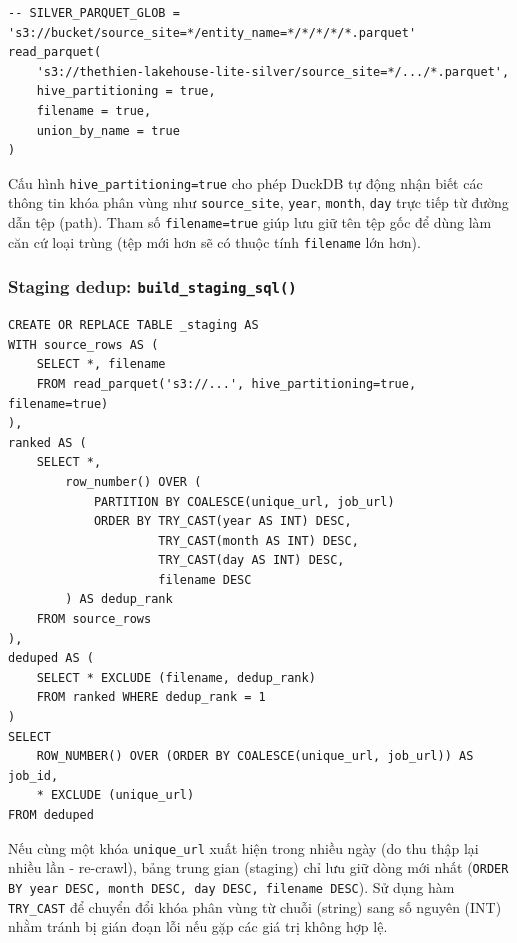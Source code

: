 \begin{lstlisting}[style=sqlstyle, caption={DuckDB read\_parquet với hive partitioning}, label={lst:read-parquet-sql}]
-- SILVER_PARQUET_GLOB = 's3://bucket/source_site=*/entity_name=*/*/*/*/*.parquet'
read_parquet(
    's3://thethien-lakehouse-lite-silver/source_site=*/.../*.parquet',
    hive_partitioning = true,
    filename = true,
    union_by_name = true
)
\end{lstlisting}

Cấu hình \texttt{hive\_partitioning=true} cho phép DuckDB tự động nhận biết các thông tin khóa phân vùng như
\texttt{source\_site}, \texttt{year}, \texttt{month}, \texttt{day}
trực tiếp từ đường dẫn tệp (path). Tham số \texttt{filename=true} giúp lưu giữ tên tệp gốc để dùng làm căn cứ loại trùng
(tệp mới hơn sẽ có thuộc tính \texttt{filename} lớn hơn).

\subsubsection{Staging dedup: \texttt{build\_staging\_sql()}}

\begin{lstlisting}[style=sqlstyle, caption={Staging: dedup theo unique\_url + gán job\_id}, label={lst:staging-sql}]
CREATE OR REPLACE TABLE _staging AS
WITH source_rows AS (
    SELECT *, filename
    FROM read_parquet('s3://...', hive_partitioning=true, filename=true)
),
ranked AS (
    SELECT *,
        row_number() OVER (
            PARTITION BY COALESCE(unique_url, job_url)
            ORDER BY TRY_CAST(year AS INT) DESC,
                     TRY_CAST(month AS INT) DESC,
                     TRY_CAST(day AS INT) DESC,
                     filename DESC
        ) AS dedup_rank
    FROM source_rows
),
deduped AS (
    SELECT * EXCLUDE (filename, dedup_rank)
    FROM ranked WHERE dedup_rank = 1
)
SELECT
    ROW_NUMBER() OVER (ORDER BY COALESCE(unique_url, job_url)) AS job_id,
    * EXCLUDE (unique_url)
FROM deduped
\end{lstlisting}

Nếu cùng một khóa \texttt{unique\_url} xuất hiện trong nhiều ngày (do thu thập lại nhiều lần - re-crawl), bảng trung gian (staging)
chỉ lưu giữ dòng mới nhất (\texttt{ORDER BY year DESC, month DESC, day DESC,
filename DESC}). Sử dụng hàm \texttt{TRY\_CAST} để chuyển đổi khóa phân vùng từ chuỗi (string)
sang số nguyên (INT) nhằm tránh bị gián đoạn lỗi nếu gặp các giá trị không hợp lệ.

